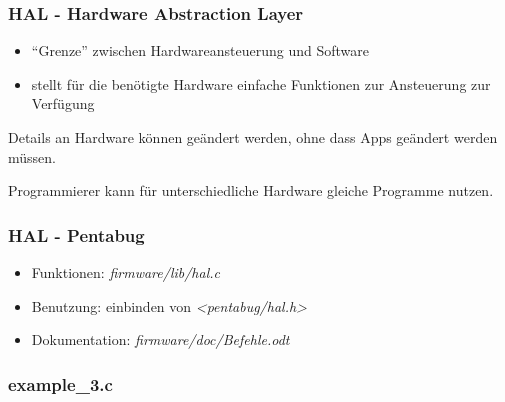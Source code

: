 \documentclass[12pt]{beamer}
\begin{document}
\begin{frame}
    \frametitle{HAL - Hardware Abstraction Layer}
    \begin{itemize}
	    \item ``Grenze'' zwischen Hardwareansteuerung und Software
	    \item stellt für die benötigte Hardware einfache Funktionen zur Ansteuerung zur Verfügung
    \end{itemize}
    \begin{definition}
	    Details an Hardware können geändert werden, ohne dass Apps geändert werden müssen.
    \end{definition}
     \begin{definition}
	    Programmierer kann für unterschiedliche Hardware gleiche Programme nutzen.
    \end{definition}
\end{frame}

\begin{frame}
    \frametitle{HAL - Pentabug}
    \begin{itemize}
	    \item {Funktionen: \textit{firmware/lib/hal.c}}
	    \item {Benutzung: einbinden von \textit{<pentabug/hal.h>}}
	    \item {Dokumentation: \textit{firmware/doc/Befehle.odt}}
    \end{itemize}
\end{frame}
\begin{frame}[fragile]
	\frametitle{example\_3.c}
	
\end{frame}
\end{document}
